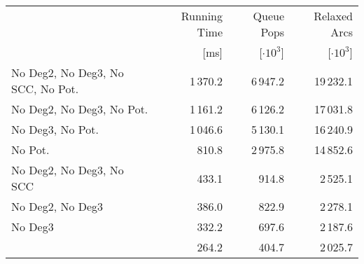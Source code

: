\begin{tabular}{lrrr}
\toprule
{} & Running Time &     Queue Pops &   Relaxed Arcs \\
{} &         [ms] & [$\cdot 10^3$] & [$\cdot 10^3$] \\
\midrule
No Deg2, No Deg3, No SCC, No Pot. &           1\,370.2 &          6\,947.2 &           19\,232.1 \\
No Deg2, No Deg3, No Pot.         &           1\,161.2 &          6\,126.2 &           17\,031.8 \\
No Deg3, No Pot.                  &           1\,046.6 &          5\,130.1 &           16\,240.9 \\
No Pot.                           &            810.8 &          2\,975.8 &           14\,852.6 \\
No Deg2, No Deg3, No SCC          &            433.1 &           914.8 &            2\,525.1 \\
No Deg2, No Deg3                  &            386.0 &           822.9 &            2\,278.1 \\
No Deg3                           &            332.2 &           697.6 &            2\,187.6 \\
                                  &            264.2 &           404.7 &            2\,025.7 \\
\bottomrule
\end{tabular}


